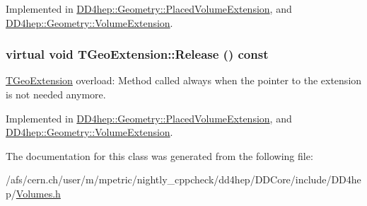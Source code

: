Implemented in \hyperlink{class_d_d4hep_1_1_geometry_1_1_placed_volume_extension_aa5261b49a18fba980e00d96161db3855}{DD4hep::Geometry::PlacedVolumeExtension}, and \hyperlink{class_d_d4hep_1_1_geometry_1_1_volume_extension_adc072e1c3a4be273940579938c6be398}{DD4hep::Geometry::VolumeExtension}.\hypertarget{class_t_geo_extension_af3013d9059744f1d7f9f9037a57bf3da}{
\subsubsection[{Release}]{\setlength{\rightskip}{0pt plus 5cm}virtual void TGeoExtension::Release () const}}
\label{class_t_geo_extension_af3013d9059744f1d7f9f9037a57bf3da}


\hyperlink{class_t_geo_extension}{TGeoExtension} overload: Method called always when the pointer to the extension is not needed anymore. 

Implemented in \hyperlink{class_d_d4hep_1_1_geometry_1_1_placed_volume_extension_a92e8b1e394a8aa6dd5ccb94f30c58318}{DD4hep::Geometry::PlacedVolumeExtension}, and \hyperlink{class_d_d4hep_1_1_geometry_1_1_volume_extension_ad61d398432c27ba62103ba5daa1d431d}{DD4hep::Geometry::VolumeExtension}.

The documentation for this class was generated from the following file:\begin{DoxyCompactItemize}
\item 
/afs/cern.ch/user/m/mpetric/nightly\_\-cppcheck/dd4hep/DDCore/include/DD4hep/\hyperlink{_volumes_8h}{Volumes.h}\end{DoxyCompactItemize}
